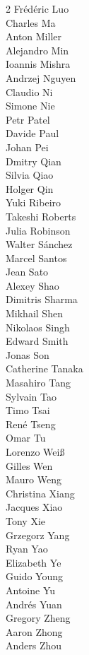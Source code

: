 \documentclass[runningheads]{llncs}
\begin{document}
\begin{multicols}{2}
Fr\'{e}d\'{e}ric Luo\\
Charles Ma\\
Anton Miller\\
Alejandro Min\\
Ioannis Mishra\\
Andrzej Nguyen\\
Claudio Ni\\
Simone Nie\\
Petr Patel\\
Davide Paul\\
Johan Pei\\
Dmitry Qian\\
Silvia Qiao\\
Holger Qin\\
Yuki Ribeiro\\
Takeshi Roberts\\
Julia Robinson\\
Walter S\'{a}nchez\\
Marcel Santos\\
Jean Sato\\
Alexey Shao\\
Dimitris Sharma\\
Mikhail Shen\\
Nikolaos Singh\\
Edward Smith\\
Jonas Son\\
Catherine Tanaka\\
Masahiro Tang\\
Sylvain Tao\\
Timo Tsai\\
Ren\'{e} Tseng\\
Omar Tu\\
Lorenzo Wei{\ss}\\
Gilles Wen\\
Mauro Weng\\
Christina Xiang\\
Jacques Xiao\\
Tony Xie\\
Grzegorz Yang\\
Ryan Yao\\
Elizabeth Ye\\
Guido Young\\
Antoine Yu\\
Andr\'{e}s Yuan\\
Gregory Zheng\\
Aaron Zhong\\
Anders Zhou
\end{multicols}
\end{document}
